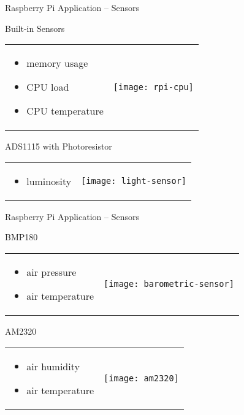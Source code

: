 \begin{frame}{Raspberry Pi Application -- Sensors}
    \begin{block}{Built-in Sensors}
      \begin{tabularx}{\textwidth}{XC}
        \begin{itemize}
          \item memory usage
          \item CPU load
          \item CPU temperature
        \end{itemize}
        &
        \texttt{[image: rpi-cpu]}
      \end{tabularx}
    \end{block}

    \begin{block}{ADS1115 with Photoresistor}
       \begin{tabularx}{\textwidth}{XC}
        \begin{itemize}
          \item luminosity
        \end{itemize}
        &
        \texttt{[image: light-sensor]}
      \end{tabularx}
    \end{block}
\end{frame}

\begin{frame}{Raspberry Pi Application -- Sensors}
    \begin{block}{BMP180}
      \begin{tabularx}{\textwidth}{XC}
        \begin{itemize}
          \item air pressure
          \item air temperature
        \end{itemize}
        &
        \texttt{[image: barometric-sensor]}
      \end{tabularx}
    \end{block}

    \begin{block}{AM2320}
      \begin{tabularx}{\textwidth}{XC}

        \begin{itemize}
          \item air humidity
          \item air temperature
        \end{itemize}
        &
        \texttt{[image: am2320]}
      \end{tabularx}
    \end{block}
\end{frame}

